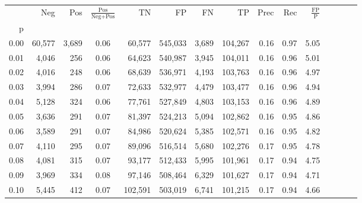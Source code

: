 \begin{tabular}{rrrcrrrrrrrrrrr}
\toprule
{} &     Neg &     Pos & $\frac{\text{Pos}}{\text{Neg}+\text{Pos}}$ &       TN &       FP &       FN &       TP &  Prec &   Rec & $\frac{\text{FP}}{\text{P}}$ \\
p    &         &         &                                            &          &          &          &          &       &       &                              \\
\midrule
0.00 &  60,577 &   3,689 &                                       0.06 &   60,577 &  545,033 &    3,689 &  104,267 &  0.16 &  0.97 &                         5.05 \\
0.01 &   4,046 &     256 &                                       0.06 &   64,623 &  540,987 &    3,945 &  104,011 &  0.16 &  0.96 &                         5.01 \\
0.02 &   4,016 &     248 &                                       0.06 &   68,639 &  536,971 &    4,193 &  103,763 &  0.16 &  0.96 &                         4.97 \\
0.03 &   3,994 &     286 &                                       0.07 &   72,633 &  532,977 &    4,479 &  103,477 &  0.16 &  0.96 &                         4.94 \\
0.04 &   5,128 &     324 &                                       0.06 &   77,761 &  527,849 &    4,803 &  103,153 &  0.16 &  0.96 &                         4.89 \\
0.05 &   3,636 &     291 &                                       0.07 &   81,397 &  524,213 &    5,094 &  102,862 &  0.16 &  0.95 &                         4.86 \\
0.06 &   3,589 &     291 &                                       0.07 &   84,986 &  520,624 &    5,385 &  102,571 &  0.16 &  0.95 &                         4.82 \\
0.07 &   4,110 &     295 &                                       0.07 &   89,096 &  516,514 &    5,680 &  102,276 &  0.17 &  0.95 &                         4.78 \\
0.08 &   4,081 &     315 &                                       0.07 &   93,177 &  512,433 &    5,995 &  101,961 &  0.17 &  0.94 &                         4.75 \\
0.09 &   3,969 &     334 &                                       0.08 &   97,146 &  508,464 &    6,329 &  101,627 &  0.17 &  0.94 &                         4.71 \\
0.10 &   5,445 &     412 &                                       0.07 &  102,591 &  503,019 &    6,741 &  101,215 &  0.17 &  0.94 &                         4.66 \\

\end{tabular}
